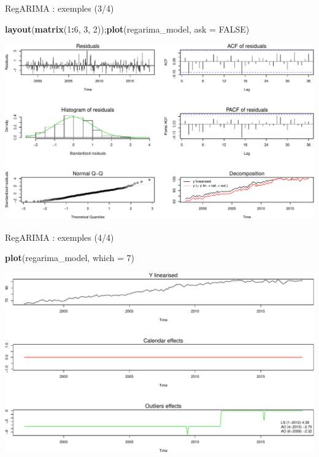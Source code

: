 \documentclass[10pt,xcolor=table,color={dvipsnames,usenames},ignorenonframetext,usepdftitle=false,french]{beamer}
\newenvironment{Shaded}{\begin{snugshade}}{\end{snugshade}}
\newcommand{\DataTypeTok}[1]{\textcolor[rgb]{0.13,0.29,0.53}{#1}}
\newcommand{\DecValTok}[1]{\textcolor[rgb]{0.00,0.00,0.81}{#1}}
\newcommand{\KeywordTok}[1]{\textcolor[rgb]{0.13,0.29,0.53}{\textbf{#1}}}
\newcommand{\NormalTok}[1]{#1}
\newcommand{\OperatorTok}[1]{\textcolor[rgb]{0.81,0.36,0.00}{\textbf{#1}}}
\newcommand{\OtherTok}[1]{\textcolor[rgb]{0.56,0.35,0.01}{#1}}
\begin{document}
\begin{frame}[fragile]{RegARIMA : exemples (3/4)}
\protect\hypertarget{regarima-exemples-34}{}

\begin{Shaded}
\begin{Highlighting}[]
\KeywordTok{layout}\NormalTok{(}\KeywordTok{matrix}\NormalTok{(}\DecValTok{1}\OperatorTok{:}\DecValTok{6}\NormalTok{, }\DecValTok{3}\NormalTok{, }\DecValTok{2}\NormalTok{));}\KeywordTok{plot}\NormalTok{(regarima_model, }\DataTypeTok{ask =} \OtherTok{FALSE}\NormalTok{)}
\end{Highlighting}
\end{Shaded}

\includegraphics{Diapos/1 - R et JDemetra+_files/figure-beamer/unnamed-chunk-11-1.pdf}

\end{frame}

\begin{frame}[fragile]{RegARIMA : exemples (4/4)}
\protect\hypertarget{regarima-exemples-44}{}

\begin{Shaded}
\begin{Highlighting}[]
\KeywordTok{plot}\NormalTok{(regarima_model, }\DataTypeTok{which =} \DecValTok{7}\NormalTok{)}
\end{Highlighting}
\end{Shaded}

\includegraphics{Diapos/1 - R et JDemetra+_files/figure-beamer/unnamed-chunk-13-1.pdf}

\end{frame}
\end{document}
